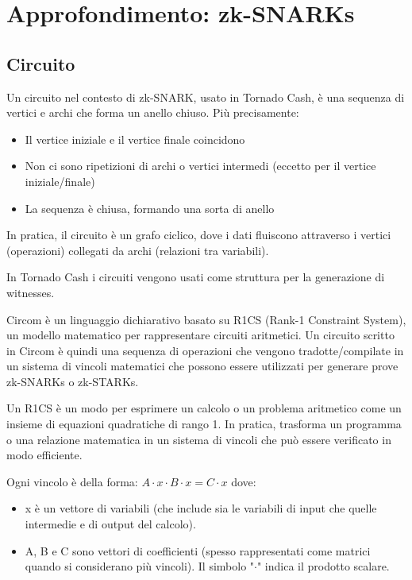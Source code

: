 \chapter{Approfondimento: zk-SNARKs}
\label{cap:zk-snarks}

\section{Circuito}

Un circuito nel contesto di zk-SNARK, usato in Tornado Cash, è una sequenza di vertici e archi che forma un anello chiuso. Più precisamente:

\begin{itemize}
    \item Il vertice iniziale e il vertice finale coincidono
    \item Non ci sono ripetizioni di archi o vertici intermedi (eccetto per il vertice iniziale/finale)
    \item La sequenza è chiusa, formando una sorta di anello
\end{itemize}

In pratica, il circuito è un grafo ciclico, dove i dati fluiscono attraverso i vertici (operazioni) collegati da archi (relazioni tra variabili).

In Tornado Cash i circuiti vengono usati come struttura per la generazione di witnesses.

Circom è un linguaggio dichiarativo basato su R1CS (Rank-1 Constraint System)\cite{ben2013snarks}, un modello matematico per rappresentare circuiti aritmetici. Un circuito scritto in Circom è quindi una sequenza di operazioni che vengono tradotte/compilate in un sistema di vincoli matematici che possono essere utilizzati per generare prove zk-SNARKs o zk-STARKs.

Un R1CS è un modo per esprimere un calcolo o un problema aritmetico come un insieme di equazioni quadratiche di rango 1. In pratica, trasforma un programma o una relazione matematica in un sistema di vincoli che può essere verificato in modo efficiente. 

Ogni vincolo è della forma: $A\cdot x\cdot B\cdot x = C\cdot x$ dove:

\begin{itemize}
    \item x è un vettore di variabili (che include sia le variabili di input che quelle intermedie e di output del calcolo).
    \item A, B e C sono vettori di coefficienti (spesso rappresentati come matrici quando si considerano più vincoli).
    Il simbolo "$\cdot$" indica il prodotto scalare.
\end{itemize}

